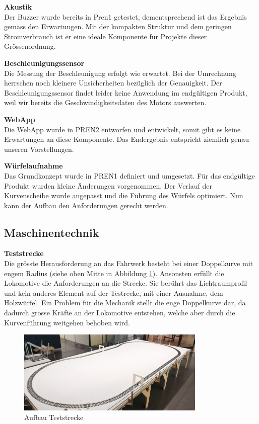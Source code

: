 \documentclass[../../main.tex]{subfiles}
\begin{document}
\textbf{Akustik}\\
Der Buzzer wurde bereits in Pren1 getestet, dementsprechend ist das Ergebnis gemäss den Erwartungen. Mit der kompakten Struktur und dem geringen Stromverbrauch ist er eine ideale Komponente für Projekte dieser Grössenordnung.

\textbf{Beschleunigungssensor}\\
Die Messung der Beschleunigung erfolgt wie erwartet. Bei der Umrechnung herrschen noch kleinere Unsicherheiten bezüglich der Genauigkeit. Der Beschleunigungssensor findet leider keine Anwendung im endgültigen Produkt, weil wir bereits die Geschwindigkeitsdaten des Motors auswerten.

\textbf{WebApp}\\
Die WebApp wurde in PREN2 entworfen und entwickelt, somit gibt es keine Erwartungen an diese Komponente. Das Endergebnis entspricht ziemlich genau unseren Vorstellungen.

\textbf{Würfelaufnahme}\\
Das Grundkonzept wurde in PREN1 definiert und umgesetzt. Für das endgültige Produkt wurden kleine Änderungen vorgenommen. Der Verlauf der Kurvenscheibe wurde angepasst und die Führung des Würfels optimiert. Nun kann der Aufbau den Anforderungen gerecht werden. 

\pagebreak

\subsection{Maschinentechnik}

\textbf{Teststrecke}\\
Die grösste Herausforderung an das Fahrwerk besteht bei einer Doppelkurve mit engem Radius (siehe oben Mitte in Abbildung \ref{fig:teststrecke1}). Ansonsten erfüllt die Lokomotive die Anforderungen an die Strecke. Sie berührt das Lichtraumprofil und kein anderes Element auf der Testrecke, mit einer Ausnahme, dem Holzwürfel. Ein Problem für die Mechanik stellt die enge Doppelkurve dar, da dadurch grosse Kräfte an der Lokomotive entstehen, welche aber durch die Kurvenführung weitgehen behoben wird.\\

\begin{figure}[H]
    \centering
    \includegraphics[width=0.8\textwidth]{teststrecke1.PNG}
    \caption {Aufbau Teststrecke}
    \label{fig:teststrecke1}
  \end{figure}
\end{document}
